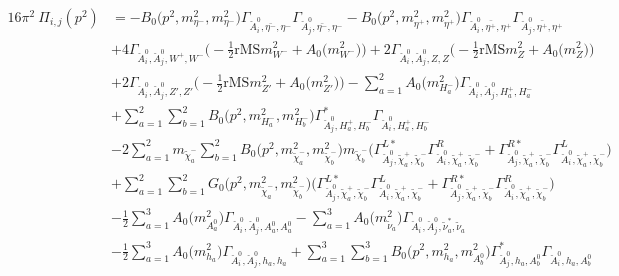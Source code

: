 \begin{itemize}
\begin{align} 
16\pi^2 \ \Pi_{i,j}(p^2) &= - {B_0\Big(p^{2},m^2_{\eta^-},m^2_{\eta^-}\Big)} {\Gamma_{\check{A}^0_{{i}},\bar{\eta^-},\eta^-}} {\Gamma_{\check{A}^0_{{j}},\bar{\eta^-},\eta^-}} - {B_0\Big(p^{2},m^2_{\eta^+},m^2_{\eta^+}\Big)} {\Gamma_{\check{A}^0_{{i}},\bar{\eta^+},\eta^+}} {\Gamma_{\check{A}^0_{{j}},\bar{\eta^+},\eta^+}} \nonumber \\ 
 &+4 {\Gamma_{\check{A}^0_{{i}},\check{A}^0_{{j}},W^+,W^-}} \Big(-\frac{1}{2} \text{rMS} m^2_{W^-}  + {A_0\Big(m^2_{W^-}\Big)}\Big)+2 {\Gamma_{\check{A}^0_{{i}},\check{A}^0_{{j}},Z,Z}} \Big(-\frac{1}{2} \text{rMS} m^2_{Z}  + {A_0\Big(m^2_{Z}\Big)}\Big)\nonumber \\ 
 &+2 {\Gamma_{\check{A}^0_{{i}},\check{A}^0_{{j}},{Z'},{Z'}}} \Big(-\frac{1}{2} \text{rMS} m^2_{{Z'}}  + {A_0\Big(m^2_{{Z'}}\Big)}\Big)- \sum_{a=1}^{2}{A_0\Big(m^2_{H^-_{{a}}}\Big)} {\Gamma_{\check{A}^0_{{i}},\check{A}^0_{{j}},H^+_{{a}},H^-_{{a}}}}  \nonumber \\ 
 &+\sum_{a=1}^{2}\sum_{b=1}^{2}{B_0\Big(p^{2},m^2_{H^-_{{a}}},m^2_{H^-_{{b}}}\Big)} {\Gamma^*_{\check{A}^0_{{j}},H^+_{{a}},H^-_{{b}}}} {\Gamma_{\check{A}^0_{{i}},H^+_{{a}},H^-_{{b}}}} \nonumber \\ 
 &-2 \sum_{a=1}^{2}m_{\tilde{\chi}^-_{{a}}} \sum_{b=1}^{2}{B_0\Big(p^{2},m^2_{\tilde{\chi}^-_{{a}}},m^2_{\tilde{\chi}^-_{{b}}}\Big)} m_{\tilde{\chi}^-_{{b}}} \Big({\Gamma^{L*}_{\check{A}^0_{{j}},\tilde{\chi}^+_{{a}},\tilde{\chi}^-_{{b}}}} {\Gamma^R_{\check{A}^0_{{i}},\tilde{\chi}^+_{{a}},\tilde{\chi}^-_{{b}}}}  + {\Gamma^{R*}_{\check{A}^0_{{j}},\tilde{\chi}^+_{{a}},\tilde{\chi}^-_{{b}}}} {\Gamma^L_{\check{A}^0_{{i}},\tilde{\chi}^+_{{a}},\tilde{\chi}^-_{{b}}}} \Big)  \nonumber \\ 
 &+\sum_{a=1}^{2}\sum_{b=1}^{2}{G_0\Big(p^{2},m^2_{\tilde{\chi}^-_{{a}}},m^2_{\tilde{\chi}^-_{{b}}}\Big)} \Big({\Gamma^{L*}_{\check{A}^0_{{j}},\tilde{\chi}^+_{{a}},\tilde{\chi}^-_{{b}}}} {\Gamma^L_{\check{A}^0_{{i}},\tilde{\chi}^+_{{a}},\tilde{\chi}^-_{{b}}}}  + {\Gamma^{R*}_{\check{A}^0_{{j}},\tilde{\chi}^+_{{a}},\tilde{\chi}^-_{{b}}}} {\Gamma^R_{\check{A}^0_{{i}},\tilde{\chi}^+_{{a}},\tilde{\chi}^-_{{b}}}} \Big)\nonumber \\ 
 &-\frac{1}{2} \sum_{a=1}^{3}{A_0\Big(m^2_{A^0_{{a}}}\Big)} {\Gamma_{\check{A}^0_{{i}},\check{A}^0_{{j}},A^0_{{a}},A^0_{{a}}}}  - \sum_{a=1}^{3}{A_0\Big(m^2_{\tilde{\nu}_{{a}}}\Big)} {\Gamma_{\check{A}^0_{{i}},\check{A}^0_{{j}},\tilde{\nu}^*_{{a}},\tilde{\nu}_{{a}}}}  \nonumber \\ 
 &-\frac{1}{2} \sum_{a=1}^{3}{A_0\Big(m^2_{h_{{a}}}\Big)} {\Gamma_{\check{A}^0_{{i}},\check{A}^0_{{j}},h_{{a}},h_{{a}}}}  +\sum_{a=1}^{3}\sum_{b=1}^{3}{B_0\Big(p^{2},m^2_{h_{{a}}},m^2_{A^0_{{b}}}\Big)} {\Gamma^*_{\check{A}^0_{{j}},h_{{a}},A^0_{{b}}}} {\Gamma_{\check{A}^0_{{i}},h_{{a}},A^0_{{b}}}} \nonumber \\ 

\end{align}
\end{itemize}
